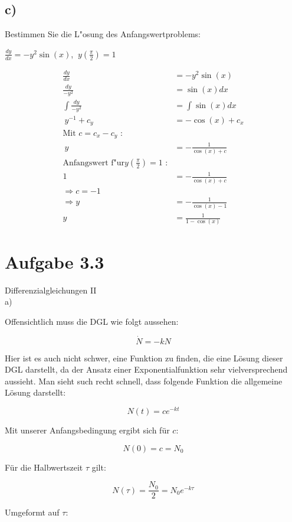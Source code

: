 \documentclass{theozettel}
\begin{document}
\subsection*{c)} Bestimmen Sie die L"osung des Anfangswertproblems:
\begin{center}
$\frac{dy}{dx} = -y^2 \sin\left(x\right)$,  $ \ y\left(\frac{\pi}{2}\right)=1$
\end{center}
\begin{align*}
\frac{dy}{dx} &= -y^2 \sin\left(x\right)\\
\frac{dy}{-y^2} &= \sin\left(x\right) dx\\
\int \frac{dy}{-y^2} &= \int \sin\left(x\right) dx\\
\ y^{-1} +c_y&= -\cos\left(x\right)+c_x\\
\text{Mit }c=c_x-c_y \text{ :}\\
\ y &= -\frac{1}{\cos\left(x\right)+c}\\
\text{Anfangswert f"ur}y\left(\frac{\pi}{2}\right)=1 \text{ :}\\
1&=-\frac{1}{\cos\left(x\right)+c}\\
\Rightarrow c=-1\\
\Rightarrow y&=-\frac{1}{\cos\left(x\right)-1}\\
y&=\frac{1}{1-\cos\left(x\right)}
\end{align*}
\newpage
\section*{Aufgabe 3.3}Differenzialgleichungen II\\

a)

Offensichtlich muss die DGL wie folgt aussehen:

$$
\dot{N} = - k N
$$

Hier ist es auch nicht schwer, eine Funktion zu finden, die eine Lösung dieser DGL darstellt, da der Ansatz einer Exponentialfunktion sehr vielversprechend aussieht. Man sieht such recht schnell, dass folgende Funktion die allgemeine Lösung darstellt:

$$
N(t) = c e^{-k t}
$$

Mit unserer Anfangsbedingung ergibt sich für $c$:

$$
N(0) = c = N_0
$$

Für die Halbwertszeit $\tau$ gilt:

$$
N(\tau) = \frac{N_0}{2} = N_0 e^{-k \tau}
$$

Umgeformt auf $\tau$:
\end{document}

